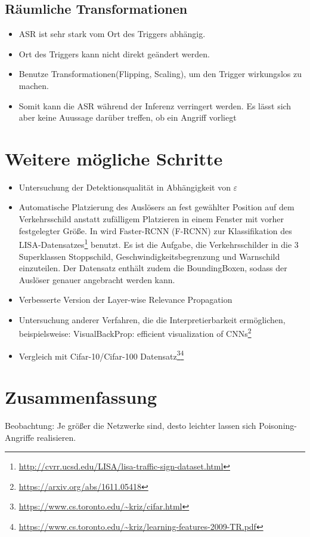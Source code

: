 \documentclass[twoside, 11pt,a4paper]{article}
\numberwithin{equation}{section}
\begin{document}
	\subsection{Räumliche Transformationen}
	\begin{itemize}
		\item ASR ist sehr stark vom Ort des Triggers abhängig.
		\item Ort des Triggers kann nicht direkt geändert werden.
		\item Benutze Transformationen(Flipping, Scaling), um den Trigger wirkungslos zu machen.
		\item Somit kann die ASR während der Inferenz verringert werden. Es lässt sich aber keine Auussage darüber treffen, ob ein Angriff vorliegt
	\end{itemize}
	
	\section{Weitere mögliche Schritte} \label{chapter_weitereSchritte}
	\begin{itemize}
		\item Untersuchung der Detektionsqualität in Abhängigkeit von $\varepsilon$
		\item Automatische Platzierung des Auslösers an fest gewählter Position auf dem Verkehrsschild anstatt zufälligem Platzieren in einem Fenster mit vorher festgelegter Größe. In \cite{badnets} wird  Faster-RCNN (F-RCNN) zur Klassifikation des LISA-Datensatzes\footnote{\url{http://cvrr.ucsd.edu/LISA/lisa-traffic-sign-dataset.html}} benutzt. Es ist die Aufgabe, die Verkehrsschilder in die 3 Superklassen Stoppschild, Geschwindigkeitsbegrenzung und Warnschild einzuteilen. Der Datensatz enthält zudem die BoundingBoxen, sodass der Auslöser genauer angebracht werden kann.
		\item Verbesserte Version der Layer-wise Relevance Propagation
		\item Untersuchung anderer Verfahren, die die Interpretierbarkeit ermöglichen, beispielsweise: VisualBackProp: efficient visualization of CNNs\footnote{\url{https://arxiv.org/abs/1611.05418}}
		\item Vergleich mit Cifar-10/Cifar-100 Datensatz\footnote{\url{https://www.cs.toronto.edu/~kriz/cifar.html}}\footnote{\url{https://www.cs.toronto.edu/~kriz/learning-features-2009-TR.pdf}}
	\end{itemize}


	\section{Zusammenfassung} \label{chapter_conclusion}
	Beobachtung: Je größer die Netzwerke sind, desto leichter lassen sich Poisoning-Angriffe realisieren.
	
\end{document}
